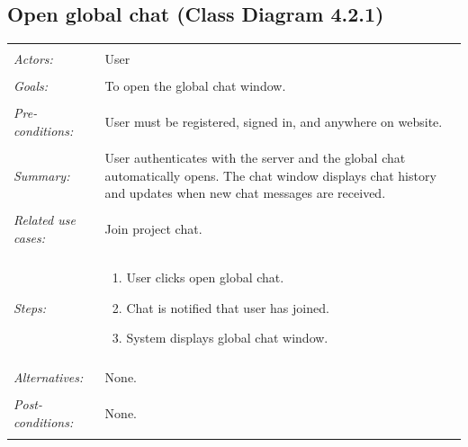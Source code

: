 \documentclass[11pt]{report}
\begin{document}
\subsection{Open global chat (Class Diagram 4.2.1)}
\begin{tabular}{ p{2cm} p{12cm} }
 \hline
 \\
 \textit{Actors:} & User \\ 
 \\
 \textit{Goals:} & To open the global chat window. \\
 \\
 \textit{Pre-conditions:} & User must be registered, signed in, and anywhere on website.  \\
 \\
 \textit{Summary:} & User authenticates with the server and the global chat automatically opens. The chat window displays chat history and updates when new chat messages are received.  \\ 
 \\
 \textit{Related use cases:} & Join project chat. \\ 
 \\
 \textit{Steps:} & \begin{enumerate}
  \item User clicks open global chat.
  \item Chat is notified that user has joined.
  \item System displays global chat window.
 \end{enumerate} \\
 \\
 \textit{Alternatives:} & None. \\
 \\
 \textit{Post-conditions:} & None. \\
 \\
\hline
\end{tabular}
\end{document}
